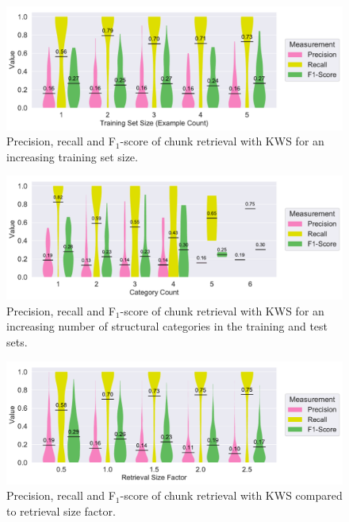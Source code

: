 \documentclass[\myrootdir/main.tex]{subfiles}
\begin{document}
\begin{figure}[hp]
		\centering
		\includegraphics[width=\textwidth, clip]{img/big-study/recall-precision-examplecount-KWS.pdf}
		\caption{Precision, recall and F$_{1}$-score of chunk retrieval with KWS for an increasing training set size.}
		\label{fig:recall-precision-examplecount-KWS}
\end{figure}

\begin{figure}[hp]
		\centering
		\includegraphics[width=\textwidth, clip]{img/big-study/recall-precision-categorycount-KWS.pdf}
		\caption{Precision, recall and F$_{1}$-score of chunk retrieval with KWS for an increasing number of structural categories in the training and test sets.}
		\label{fig:recall-precision-categorycount-KWS}
\end{figure}

\begin{figure}[hp]
		\centering
		\includegraphics[width=\textwidth, clip]{img/big-study/contextsizefactor-precision-recall-KWS.pdf}
		\caption{Precision, recall and F$_{1}$-score of chunk retrieval with KWS compared to retrieval size factor.}
		\label{fig:contextsizefactor-precision-recall-KWS}
\end{figure}
\end{document}
